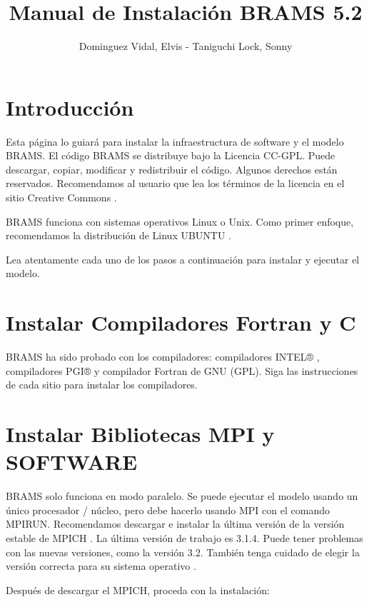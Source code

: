 \documentclass[12pt,letterpaper]{article}
\title{Manual de Instalación BRAMS 5.2}
\author{Dominguez Vidal, Elvis - Taniguchi Lock, Sonny}
\begin{document}
\maketitle
\section{Introducción}
Esta página lo guiará para instalar la infraestructura de software y el modelo BRAMS. El código BRAMS se distribuye bajo la Licencia CC-GPL. Puede descargar, copiar, modificar y redistribuir el código. Algunos derechos están reservados. Recomendamos al usuario que lea los términos de la licencia en el sitio Creative Commons .

BRAMS funciona con sistemas operativos Linux o Unix. Como primer enfoque, recomendamos la distribución de Linux UBUNTU .

Lea atentamente cada uno de los pasos a continuación para instalar y ejecutar el modelo.

\section{Instalar Compiladores Fortran y C}
BRAMS ha sido probado con los compiladores: compiladores INTEL® , compiladores PGI® y compilador Fortran de GNU (GPL). Siga las instrucciones de cada sitio para instalar los compiladores.

\section{Instalar Bibliotecas MPI y SOFTWARE}
BRAMS solo funciona en modo paralelo. Se puede ejecutar el modelo usando un único procesador / núcleo, pero debe hacerlo usando MPI con el comando MPIRUN. Recomendamos descargar e instalar la última versión de la versión estable de MPICH . La última versión de trabajo es 3.1.4. Puede tener problemas con las nuevas versiones, como la versión 3.2. También tenga cuidado de elegir la versión correcta para su sistema operativo .

Después de descargar el MPICH, proceda con la instalación: 
\end{document}
